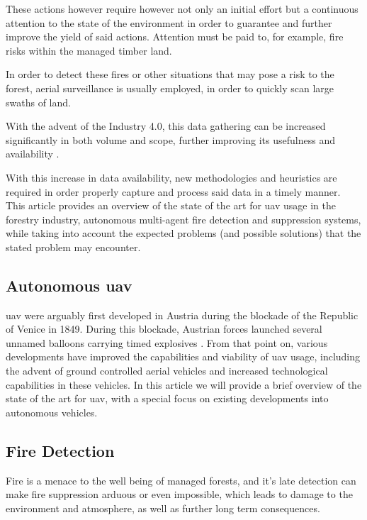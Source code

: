 \documentclass[runningheads]{llncs}
\begin{document}
These actions however require however not only an initial effort but a continuous attention to the state of the environment in order to guarantee and further improve the yield of said actions. Attention must be paid to, for example, fire risks within the managed timber land.

In order to detect these fires or other situations that may pose a risk to the forest, aerial surveillance is usually employed, in order to quickly scan large swaths of land. 

With the advent of the Industry 4.0, this data gathering can be increased significantly in both volume and scope, further improving its usefulness and availability \cite{Hood_Brady_2016}.

With this increase in data availability, new methodologies and heuristics are required in order properly capture and process said data in a timely manner. This article provides an overview of the state of the art for \acrshort{uav} usage in the forestry industry, autonomous multi-agent fire detection and suppression systems, while taking into account the expected problems (and possible solutions) that the stated problem may encounter.

\subsection{Autonomous \acrshort{uav}}

\acrshort{uav} were arguably first developed in Austria during the blockade of the Republic of Venice in 1849. During this blockade, Austrian forces launched several unnamed balloons carrying timed explosives . From that point on, various developments have improved the capabilities and viability of \acrshort{uav} usage, including the advent of ground controlled aerial vehicles and increased technological capabilities in these vehicles. In this article we will provide a brief overview of the state of the art for \acrshort{uav}, with a special focus on existing developments into autonomous vehicles.

\subsection{Fire Detection}

Fire is a menace to the well being of managed forests, and it's late detection can make fire suppression arduous or even impossible, which leads to damage to the environment and atmosphere, as well as further long term consequences. 
\end{document}
